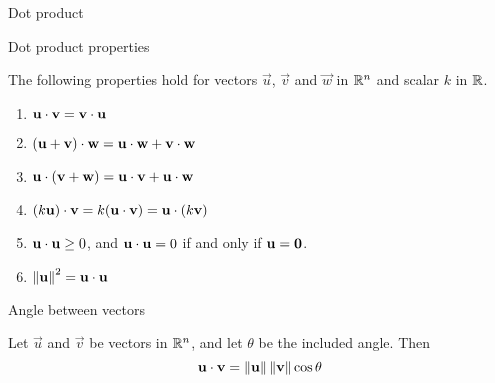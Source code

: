 \documentclass{ximera}
\begin{document}



















    



Dot product 


Dot product properties
\begin{expandable}
    The following properties hold for
  vectors $\vec{u}$, $\vec{v}$ and $\vec{w}$ in $\RR^n$ and scalar
  $k$ in $\RR$.
  \begin{enumerate}
  \item
    $\vec{u}\dotp\vec{v}=\vec{v}\dotp\vec{u}$
  \item $(\vec{u}+\vec{v})\dotp \vec{w}=\vec{u}\dotp \vec{w}+\vec{v}\dotp \vec{w}$
  \item $\vec{u}\dotp (\vec{v}+\vec{w})=\vec{u}\dotp\vec{v}+\vec{u}\dotp \vec{w}$
  \item $(k\vec{u})\dotp \vec{v}=k(\vec{u}\dotp\vec{v})=\vec{u}\dotp (k\vec{v})$
  \item  $\vec{u}\dotp\vec{u}\geq 0$, and $\vec{u}\dotp\vec{u}=0$ if and only if $\vec{u}={\bf 0}$.
  \item 
    $\norm{\vec{u}}^2=\vec{u}\dotp\vec{u}$
  \end{enumerate}
\end{expandable}


Angle between vectors
\begin{expandable}
     Let $\vec{u}$ and $\vec{v}$ be vectors in $\RR^n$, and let $\theta$ be the included angle.  Then
  $$\vec{u}\dotp\vec{v}=\norm{\vec{u}}\norm{\vec{v}}\cos \theta$$
\end{expandable}
\end{document}

